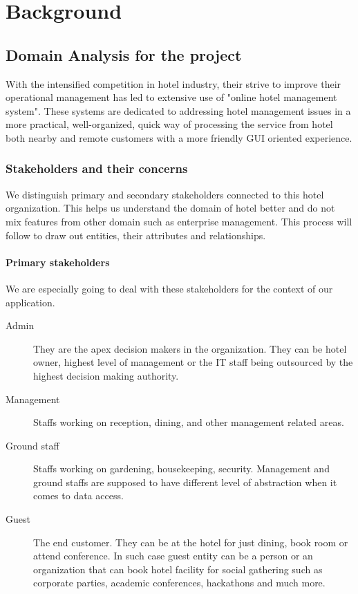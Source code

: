 \chapter{Background}

\section[Domain Analysis]{Domain Analysis for the project}

With the intensified competition in hotel industry, their strive to improve their operational management has led to extensive use of "online hotel management system". These systems are dedicated to addressing hotel management issues in a more practical, well-organized, quick way of processing the service from hotel both nearby and remote customers with a more friendly GUI oriented experience. \cite{IJOE_Hotel_Management}

\subsection{Stakeholders and their concerns}

We distinguish primary and secondary stakeholders connected to this hotel organization. This helps us understand the domain of hotel better and do not mix features from other domain such as enterprise management. This process will follow to draw out entities, their attributes and relationships.

\subsubsection{Primary stakeholders}

We are especially going to deal with these stakeholders for the context of our application.

\begin{description}
	\item[Admin] They are the apex decision makers in the organization. They can be hotel owner, highest level of management or the IT staff being outsourced by the highest decision making authority.
	\item[Management] Staffs working on reception, dining, and other management related areas.
	\item[Ground staff] Staffs working on gardening, housekeeping, security. Management and ground staffs are supposed to have different level of abstraction when it comes to data access.
	\item[Guest] The end customer. They can be at the hotel for just dining, book room or attend conference. In such case guest entity can be a person or an organization that can book hotel facility for social gathering such as corporate parties, academic conferences, hackathons and much more.
\end{description}

